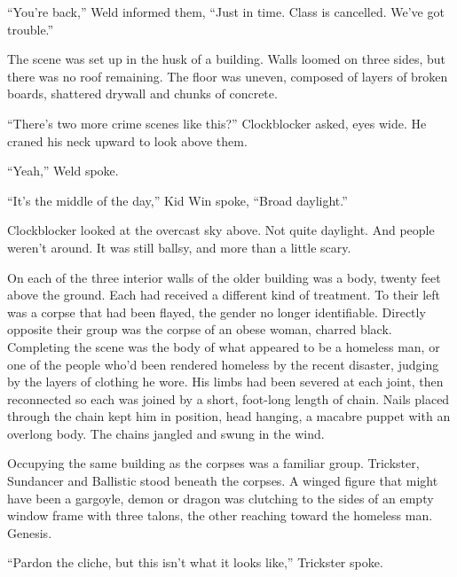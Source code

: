 ``You're back,'' Weld informed them, ``Just in time.  Class is cancelled.  We've got trouble.''



\blacksquare



The scene was set up in the husk of a building.  Walls loomed on three sides, but there was no roof remaining.  The floor was uneven, composed of layers of broken boards, shattered drywall and chunks of concrete.



``There's two more crime scenes like this?'' Clockblocker asked, eyes wide.  He craned his neck upward to look above them.



``Yeah,'' Weld spoke.



``It's the middle of the day,'' Kid Win spoke, ``Broad daylight.''



Clockblocker looked at the overcast sky above.  Not quite daylight. And people weren't around.  It was still ballsy, and more than a little scary.



On each of the three interior walls of the older building was a body, twenty feet above the ground.  Each had received a different kind of treatment.  To their left was a corpse that had been flayed, the gender no longer identifiable.  Directly opposite their group was the corpse of an obese woman, charred black.  Completing the scene was the body of what appeared to be a homeless man, or one of the people who'd been rendered homeless by the recent disaster, judging by the layers of clothing he wore.  His limbs had been severed at each joint, then reconnected so each was joined by a short, foot-long length of chain.  Nails placed through the chain kept him in position, head hanging, a macabre puppet with an overlong body.  The chains jangled and swung in the wind.



Occupying the same building as the corpses was a familiar group.  Trickster, Sundancer and Ballistic stood beneath the corpses.  A winged figure that might have been a gargoyle, demon or dragon was clutching to the sides of an empty window frame with three talons, the other reaching toward the homeless man.  Genesis.



``Pardon the cliche, but this isn't what it looks like,'' Trickster spoke.



